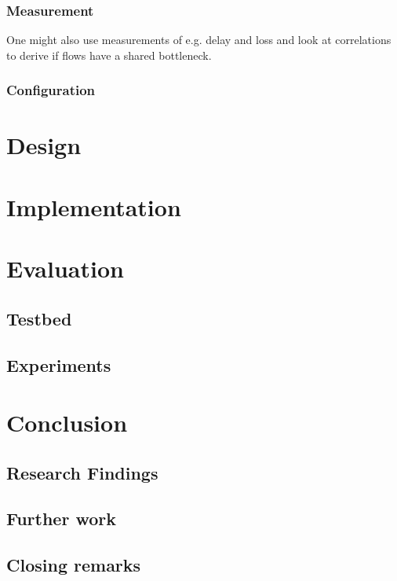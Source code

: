 \documentclass[UKenglish]{ifimaster}
\begin{document}
\subsection{Measurement}
One might also use measurements of e.g. delay and loss and look at correlations to derive if flows have a shared bottleneck.
\subsection{Configuration}


\chapter{Design}

\chapter{Implementation}                 


\chapter{Evaluation}
\section{Testbed}
\section{Experiments}

\chapter{Conclusion}                    
\section{Research Findings}
\section{Further work}
\section{Closing remarks}

\backmatter{}
\printbibliography
\end{document}
